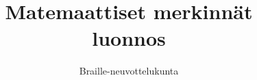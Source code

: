 \documentclass[finnish]{article}
\begin{document}
\title{Matemaattiset merkinnät \\ luonnos}
\author{Braille-neuvottelukunta}


\end{document}
